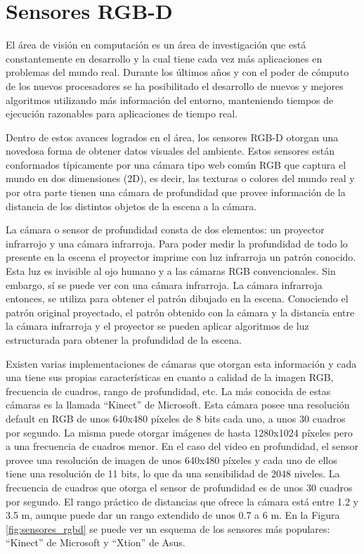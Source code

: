 \chapter{Sensores RGB-D}\label{sensores_rgbd}
El área de visión en computación es un área de investigación que está constantemente en desarrollo y la cual tiene cada vez más aplicaciones en problemas del mundo real. Durante los últimos años y con el poder de cómputo de los nuevos procesadores se ha posibilitado el desarrollo de nuevos y mejores algoritmos utilizando más información del entorno, manteniendo tiempos de ejecución razonables para aplicaciones de tiempo real.

Dentro de estos avances logrados en el área, los sensores RGB-D otorgan una novedosa forma de obtener datos visuales del ambiente. Estos sensores están conformados típicamente por una cámara tipo web común RGB que captura el mundo en dos dimensiones (2D), es decir, las texturas o colores del mundo real y por otra parte tienen una cámara de profundidad que provee información de la distancia de los distintos objetos de la escena a la cámara.

La cámara o sensor de profundidad consta de dos elementos: un proyector infrarrojo y una cámara infrarroja. Para poder medir la profundidad de todo lo presente en la escena el proyector imprime con luz infrarroja un patrón conocido. Esta luz es invisible al ojo humano y a las cámaras RGB convencionales. Sin embargo, sí se puede ver con una cámara infrarroja. La cámara infrarroja entonces, se utiliza para obtener el patrón dibujado en la escena. Conociendo el patrón original proyectado, el patrón obtenido con la cámara y la distancia entre la cámara infrarroja y el proyector se pueden aplicar algoritmos de luz estructurada para obtener la profundidad de la escena.

Existen varias implementaciones de cámaras que otorgan esta información y cada una tiene sus propias características en cuanto a calidad de la imagen RGB, frecuencia de cuadros, rango de profundidad, etc. La más conocida de estas cámaras es la llamada ``Kinect'' de Microsoft. Esta cámara posee una resolución default en RGB de unos 640x480 píxeles de 8 bits cada uno, a unos 30 cuadros por segundo. La misma puede otorgar imágenes de hasta 1280x1024 píxeles pero a una frecuencia de cuadros menor. En el caso del video en profundidad, el sensor provee una resolución de imagen de unos 640x480 píxeles y cada uno de ellos tiene una resolución de 11 bits, lo que da una sensibilidad de 2048 niveles. La frecuencia de cuadros que otorga el sensor de profundidad es de unos 30 cuadros por segundo. El rango práctico de distancias que ofrece la cámara está entre 1.2 y 3.5 m, aunque puede dar un rango extendido de unos 0.7 a 6 m. En la Figura \ref{fig:sensores_rgbd} se puede ver un esquema de los sensores más populares: ``Kinect'' de Microsoft y ``Xtion'' de Asus.

